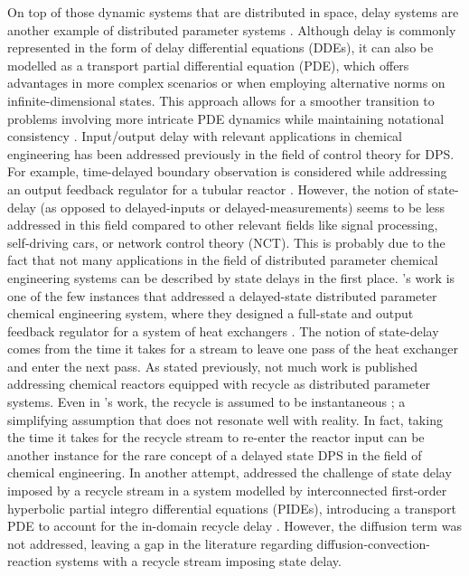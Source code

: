 On top of those dynamic systems that are distributed in space, delay systems are another example of distributed parameter systems \autocite{curtainbook}. Although delay is commonly represented in the form of delay differential equations (DDEs), it can also be modelled as a transport partial differential equation (PDE), which offers advantages in more complex scenarios or when employing alternative norms on infinite-dimensional states. This approach allows for a smoother transition to problems involving more intricate PDE dynamics while maintaining notational consistency \autocite{krstic2009book}. Input/output delay with relevant applications in chemical engineering has been addressed previously in the field of control theory for DPS. For example, time-delayed boundary observation is considered while addressing an output feedback regulator for a tubular reactor \autocite{Guilherme2019ACC}. However, the notion of state-delay (as opposed to delayed-inputs or delayed-measurements) seems to be less addressed in this field compared to other relevant fields like signal processing, self-driving cars, or network control theory (NCT). This is probably due to the fact that not many applications in the field of distributed parameter chemical engineering systems can be described by state delays in the first place. 's work is one of the few instances that addressed a delayed-state distributed parameter chemical engineering system, where they designed a full-state and output feedback regulator for a system of heat exchangers \autocite{ozorio2019heat}. The notion of state-delay comes from the time it takes for a stream to leave one pass of the heat exchanger and enter the next pass. As stated previously, not much work is published addressing chemical reactors equipped with recycle as distributed parameter systems. Even in 's work, the recycle is assumed to be instantaneous \autocite{khatibi2021model}; a simplifying assumption that does not resonate well with reality. In fact, taking the time it takes for the recycle stream to re-enter the reactor input can be another instance for the rare concept of a delayed state DPS in the field of chemical engineering. In another attempt,  addressed the challenge of state delay imposed by a recycle stream in a system modelled by interconnected first-order hyperbolic partial integro differential equations (PIDEs), introducing a transport PDE to account for the in-domain recycle delay \autocite{qi2021output}. However, the diffusion term was not addressed, leaving a gap in the literature regarding diffusion-convection-reaction systems with a recycle stream imposing state delay.

